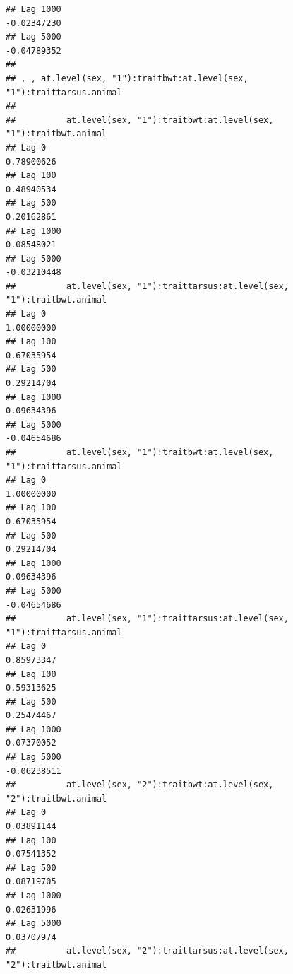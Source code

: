 \documentclass[
  12pt,
]{book}
\begin{document}
\begin{verbatim}
## Lag 1000                                                         -0.02347230
## Lag 5000                                                         -0.04789352
## 
## , , at.level(sex, "1"):traitbwt:at.level(sex, "1"):traittarsus.animal
## 
##          at.level(sex, "1"):traitbwt:at.level(sex, "1"):traitbwt.animal
## Lag 0                                                        0.78900626
## Lag 100                                                      0.48940534
## Lag 500                                                      0.20162861
## Lag 1000                                                     0.08548021
## Lag 5000                                                    -0.03210448
##          at.level(sex, "1"):traittarsus:at.level(sex, "1"):traitbwt.animal
## Lag 0                                                           1.00000000
## Lag 100                                                         0.67035954
## Lag 500                                                         0.29214704
## Lag 1000                                                        0.09634396
## Lag 5000                                                       -0.04654686
##          at.level(sex, "1"):traitbwt:at.level(sex, "1"):traittarsus.animal
## Lag 0                                                           1.00000000
## Lag 100                                                         0.67035954
## Lag 500                                                         0.29214704
## Lag 1000                                                        0.09634396
## Lag 5000                                                       -0.04654686
##          at.level(sex, "1"):traittarsus:at.level(sex, "1"):traittarsus.animal
## Lag 0                                                              0.85973347
## Lag 100                                                            0.59313625
## Lag 500                                                            0.25474467
## Lag 1000                                                           0.07370052
## Lag 5000                                                          -0.06238511
##          at.level(sex, "2"):traitbwt:at.level(sex, "2"):traitbwt.animal
## Lag 0                                                        0.03891144
## Lag 100                                                      0.07541352
## Lag 500                                                      0.08719705
## Lag 1000                                                     0.02631996
## Lag 5000                                                     0.03707974
##          at.level(sex, "2"):traittarsus:at.level(sex, "2"):traitbwt.animal

\end{verbatim}
\end{document}
